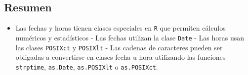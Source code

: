 \documentclass{article}\usepackage[]{graphicx}\usepackage[]{color}
\begin{document}
  \subsection{Resumen}
  \begin{itemize}
    \item Las fechas y horas tienen clases especiales en \texttt{R} que permiten cálculos numéricos y estadísticos
- Las fechas utilizan la clase \texttt{Date}
- Las horas usan las clases \texttt{POSIXct} y \texttt{POSIXlt}
- Las cadenas de caracteres pueden ser obligadas a convertirse en clases fecha u hora utilizando las funciones \texttt{strptime}, \texttt{as.Date}, \texttt{as.POSIXlt} o \texttt{as.POSIXct}. 
  \end{itemize}
\end{document}
